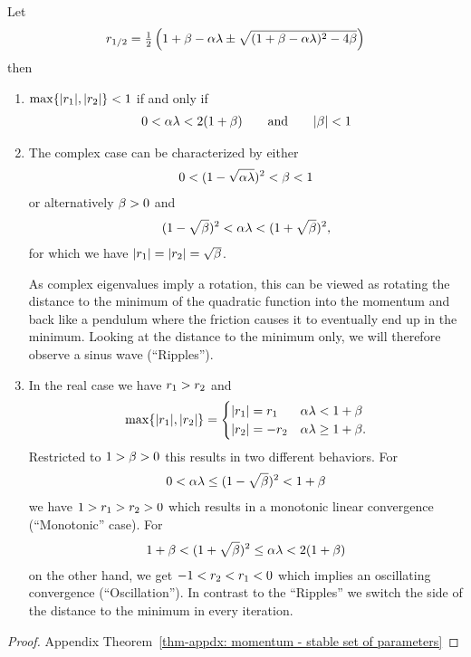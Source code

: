 \begin{theorem}
	\label{thm: momentum - stable set of parameters}
	Let
	\begin{align*}
		r_{1/2}
		= \tfrac12 \left(
			1+\beta-\alpha\lambda \pm \sqrt{(1+\beta-\alpha\lambda)^2 - 4\beta}
		\right)
	\end{align*}
	then 
	\begin{enumerate}
		\item \(\max\{|r_1|,|r_2|\}<1\) if and only if
		\begin{align*}
			0<\alpha\lambda < 2(1+\beta) \qquad \text{and} \qquad |\beta|<1
		\end{align*}
		\item The complex case can be characterized by either
		\begin{align*}
			0<(1-\sqrt{\alpha\lambda})^2 < \beta < 1
		\end{align*}		
		or alternatively \(\beta>0\) and
		\begin{align*}
			(1-\sqrt{\beta})^2 < \alpha\lambda < (1+\sqrt{\beta})^2,
		\end{align*}
		for which we have \(|r_1|=|r_2|=\sqrt{\beta}\).
		
		As complex
		eigenvalues imply a rotation, this can be viewed as rotating the distance
		to the minimum of the quadratic function into the momentum and back like 
		a pendulum where the friction causes it to eventually end up in the
		minimum. Looking at the distance to the minimum only, we will therefore
		observe a sinus wave (``Ripples'').
		\item In the real case we have \(r_1>r_2\) and
		\begin{align}
			\max\{|r_1|, |r_2|\} = \begin{cases}
				|r_1|=r_1 & \alpha\lambda < 1+\beta \\
				|r_2|=-r_2 & \alpha\lambda \ge 1+\beta.
			\end{cases}
		\end{align}
		Restricted to \(1>\beta>0\) this results in two different	
		behaviors. For
		\begin{align*}
			0<\alpha\lambda \le (1-\sqrt{\beta})^2 < 1+\beta
		\end{align*}
		we have \(1>r_1 > r_2 > 0\) which results in a monotonic
		linear convergence (``Monotonic'' case). For
		\begin{align*}
			1+\beta < (1+\sqrt{\beta})^2\le \alpha\lambda < 2(1+\beta)
		\end{align*}
		on the other hand, we get \(-1 < r_2 < r_1 < 0\) which implies 
		an oscillating convergence (``Oscillation''). In contrast to the ``Ripples''
		we switch the side of the distance to the minimum in every iteration.
	\end{enumerate}
\end{theorem}
\begin{proof}
	Appendix Theorem~\ref{thm-appdx: momentum - stable set of parameters}
\end{proof}

